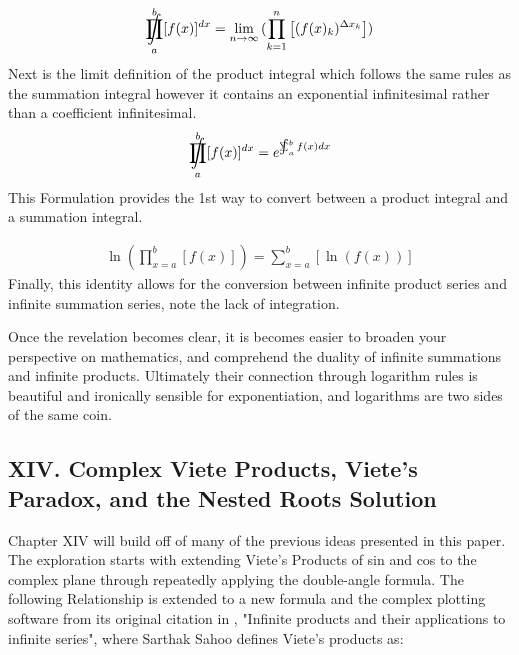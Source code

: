 \documentclass{article}
\DeclareMathOperator*{\SumInt}{%
\mathchoice%
  {\ooalign{$\displaystyle\sum$\cr\hidewidth$\displaystyle\int$\hidewidth\cr}}
  {\ooalign{\raisebox{.14\height}{\scalebox{.7}{$\textstyle\sum$}}\cr\hidewidth$\textstyle\int$\hidewidth\cr}}
  {\ooalign{\raisebox{.2\height}{\scalebox{.6}{$\scriptstyle\sum$}}\cr$\scriptstyle\int$\cr}}
  {\ooalign{\raisebox{.2\height}{\scalebox{.6}{$\scriptstyle\sum$}}\cr$\scriptstyle\int$\cr}}
}
\DeclareMathOperator*{\ProdInt}{%
\mathchoice%
  {\ooalign{$\displaystyle\prod$\cr\hidewidth$\displaystyle\int$\hidewidth\cr}}
  {\ooalign{\raisebox{.14\height}{\scalebox{.7}{$\textstyle\prod$}}\cr\hidewidth$\textstyle\int$\hidewidth\cr}}
  {\ooalign{\raisebox{.2\height}{\scalebox{.6}{$\scriptstyle\prod$}}\cr$\scriptstyle\int$\cr}}
  {\ooalign{\raisebox{.2\height}{\scalebox{.6}{$\scriptstyle\prod$}}\cr$\scriptstyle\int$\cr}}
}
\begin{document}
\begin{align*}
\ProdInt_{a}^{b} [ f(x) ]^{dx} = \lim_{n \to \infty}{(\prod_{k=1}^{n} \left[(f(x)_{k})^{\Delta x_{k}} \right])}
\end{align*}
Next is the limit definition of the product integral which follows the same rules as the summation integral however it contains an exponential infinitesimal rather than a coefficient infinitesimal.
\begin{align*}
\ProdInt_{a}^{b} [ f(x) ]^{dx} = e^{\SumInt_{a}^{b} f(x) dx}
\end{align*}
This Formulation provides the 1st way to convert between a product integral and a summation integral.

\begin{align*}
\ln(\prod_{x=a}^{b} [f(x)])= \sum_{x=a}^{b} [\ln(f(x))]
\end{align*}
Finally, this identity allows for the conversion between infinite product series and infinite summation series, note the lack of integration.

Once the revelation becomes clear, it is becomes easier to broaden your perspective on mathematics, and comprehend the duality of infinite summations and infinite products. Ultimately their connection through logarithm rules is beautiful and ironically sensible for exponentiation, and logarithms are two sides of the same coin.

\newpage
\subsection*{XIV. Complex Viete Products, Viete's Paradox, and the Nested Roots Solution}
Chapter XIV will build off of many of the previous ideas presented in this paper. The exploration starts with extending Viete's Products of sin and cos to the complex plane through repeatedly applying the double-angle formula. The following Relationship is extended to a new formula and the complex plotting software from its original citation in , "Infinite products and their applications to infinite series", where Sarthak Sahoo defines Viete's products as:
\end{document}
